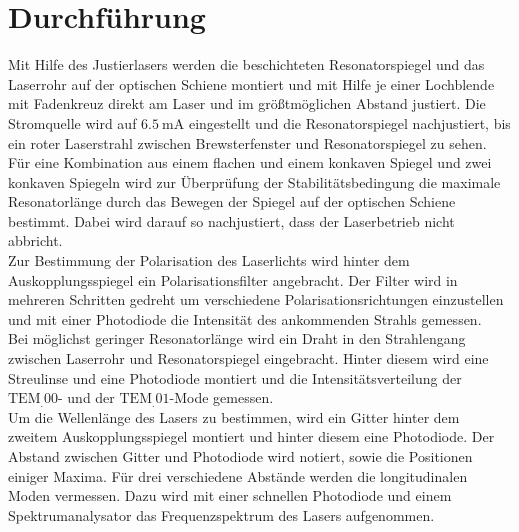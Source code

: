 \section{Durchführung}
\label{sec:Durchführung}

Mit Hilfe des Justierlasers werden die beschichteten Resonatorspiegel und das Laserrohr auf der optischen Schiene montiert und mit Hilfe je einer Lochblende mit Fadenkreuz direkt am Laser und im größtmöglichen Abstand justiert. Die Stromquelle wird auf $\SI{6.5}{\milli\ampere}$ eingestellt und die Resonatorspiegel nachjustiert, bis ein roter Laserstrahl zwischen Brewsterfenster und Resonatorspiegel zu sehen.
Für eine Kombination aus einem flachen und einem konkaven Spiegel und zwei konkaven Spiegeln wird zur Überprüfung der Stabilitätsbedingung die maximale Resonatorlänge durch das Bewegen der Spiegel auf der optischen Schiene bestimmt. Dabei wird darauf so nachjustiert, dass der Laserbetrieb nicht abbricht.\\
Zur Bestimmung der Polarisation des Laserlichts wird hinter dem Auskopplungsspiegel ein Polarisationsfilter angebracht. Der Filter wird in mehreren Schritten gedreht um verschiedene Polarisationsrichtungen einzustellen und mit einer Photodiode die Intensität des ankommenden Strahls gemessen.\\
Bei möglichst geringer Resonatorlänge wird ein Draht in den Strahlengang zwischen Laserrohr und Resonatorspiegel eingebracht. Hinter diesem wird eine Streulinse und eine Photodiode montiert und die Intensitätsverteilung der $\text{TEM}_.{00}$- und der $\text{TEM}_.{01}$-Mode gemessen.\\
Um die Wellenlänge des Lasers zu bestimmen, wird ein Gitter hinter dem zweitem Auskopplungsspiegel montiert und hinter diesem eine Photodiode. Der Abstand zwischen Gitter und Photodiode wird notiert, sowie die Positionen einiger Maxima.
Für drei verschiedene Abstände werden die longitudinalen Moden vermessen. Dazu wird mit einer schnellen Photodiode und einem Spektrumanalysator das Frequenzspektrum des Lasers aufgenommen.